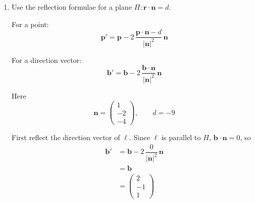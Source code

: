 \documentclass[leqno]{article}
\begin{document}
\begin{enumerate}[
  label=\textbf{\arabic*.},
  leftmargin=*,
  topsep=0pt,
  partopsep=0pt,
  parsep=0pt
]
\begin{djsSolution}
\begin{enumerate}[label=\textbf{(\roman*)}]
with \(\mathbf p=\begin{pmatrix}4\\2\\-3\end{pmatrix}\), \(\mathbf n=\begin{pmatrix}1\\-2\\-4\end{pmatrix}\) and \(d=p=-9\):
\begin{align*}
\mathbf p\cdot \mathbf n&=\begin{pmatrix}4\\2\\-3\end{pmatrix}\cdot \begin{pmatrix}1\\-2\\-4\end{pmatrix} \\
&=4-4+12 \\
&=12
\end{align*}

Also
\begin{align*}
|\mathbf n|&=\sqrt{1^2+(-2)^2+(-4)^2} \\
&=\sqrt{1+4+16} \\
&=\sqrt{21}
\end{align*}

Therefore
\begin{align*}
\mathrm{dist}&=\frac{|12-(-9)|}{\sqrt{21}} \\
&=\frac{21}{\sqrt{21}} \\
&=\sqrt{21}
\end{align*}

  \item Use the reflection formulae for a plane \(\Pi:\mathbf r\cdot \mathbf n=d\).

For a point:
\[
\mathbf p'
=\mathbf p
-2\,\dfrac{\mathbf p\cdot\mathbf n-d}{|\mathbf n|^2}\,\mathbf n
\]

For a direction vector:
\[
\mathbf b'
=\mathbf b
-2\,\dfrac{\mathbf b\cdot\mathbf n}{|\mathbf n|^2}\,\mathbf n
\]

Here
\[
\mathbf n=\begin{pmatrix}1\\-2\\-4\end{pmatrix},\qquad d=-9
\]

First reflect the direction vector of \(\ell\). Since \(\ell\) is parallel to \(\Pi\), \(\mathbf b\cdot \mathbf n=0\), so
\begin{align*}
\mathbf b'
&=\mathbf b-2\,\dfrac{0}{|\mathbf n|^2}\,\mathbf n \\
&=\mathbf b \\
&=\begin{pmatrix}2\\-1\\1\end{pmatrix}
\end{align*}


\end{enumerate}
\end{djsSolution}
\end{enumerate}
\end{document}
